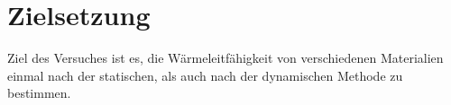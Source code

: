 
\section{Zielsetzung}
\label{sec:Zielsetzung}

Ziel des Versuches ist es, die Wärmeleitfähigkeit von verschiedenen Materialien einmal nach der statischen, als auch nach der dynamischen Methode zu bestimmen.